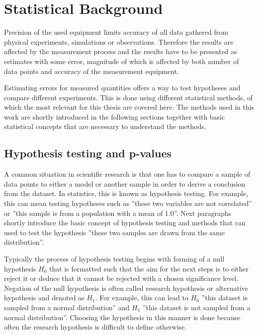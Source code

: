 \documentclass[english, oneside]{HYgradu}
\begin{document}
\section{Statistical Background}
\reversemarginpar
{}
Precision of the used equipment limits accuracy of all data gathered from physical experiments, simulations or observations. Therefore the results are affected by the measurement process and the results have to be presented as estimates with some error, magnitude of which is affected by both number of data points and accuracy of the measurement equipment. \citep{bohm2010introduction}

Estimating errors for measured quantities offers a way to test hypotheses and compare different experiments. This is done using different statistical methods, of which the most relevant for this thesis are covered here. The methods used in this work are shortly introduced in the following sections together with basic statistical concepts that are necessary to understand the methods. \citep{bohm2010introduction}



\subsection{Hypothesis testing and p-values}
A common situation in scientific research is that one has to compare a sample of data points to either a model or another sample in order to derive a conclusion from the dataset. In statistics, this is known as hypothesis testing. For example, this can mean testing hypotheses such as ''these two variables are not correlated'' or ''this sample is from a population with a mean of 1.0''. \citep{wall2003practical} Next paragraphs shortly introduce the basic concept of hypothesis testing and methods that can used to test the hypothesis ''these two samples are drawn from the same distribution''.

Typically the process of hypothesis testing begins with forming of a null hypothesis $H_0$ that is formatted such that the aim for the next steps is to either reject it or deduce that it cannot be rejected with a chosen significance level. Negation of the null hypothesis is often called research hypothesis or alternative hypothesis and denoted as $H_1$. For example, this can lead to $H_0$ ''this dataset is sampled from a normal distribution'' and $H_1$ ''this dataset is not sampled from a normal distribution''. Choosing the hypothesis in this manner is done because often the research hypothesis is difficult to define otherwise. \citep{bohm2010introduction, wall2003practical}
\end{document}
